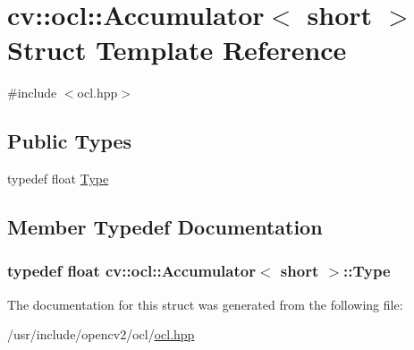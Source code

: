 \hypertarget{structcv_1_1ocl_1_1Accumulator_3_01short_01_4}{\section{cv\-:\-:ocl\-:\-:Accumulator$<$ short $>$ Struct Template Reference}
\label{structcv_1_1ocl_1_1Accumulator_3_01short_01_4}
}


{\ttfamily \#include $<$ocl.\-hpp$>$}

\subsection*{Public Types}
\begin{DoxyCompactItemize}
\item 
typedef float \hyperlink{structcv_1_1ocl_1_1Accumulator_3_01short_01_4_a200b44ab238d3f38500779d5f4cdc398}{Type}
\end{DoxyCompactItemize}


\subsection{Member Typedef Documentation}
\hypertarget{structcv_1_1ocl_1_1Accumulator_3_01short_01_4_a200b44ab238d3f38500779d5f4cdc398}{
\subsubsection[{Type}]{\setlength{\rightskip}{0pt plus 5cm}typedef float {\bf cv\-::ocl\-::\-Accumulator}$<$ short $>$\-::{\bf Type}}}\label{structcv_1_1ocl_1_1Accumulator_3_01short_01_4_a200b44ab238d3f38500779d5f4cdc398}


The documentation for this struct was generated from the following file\-:\begin{DoxyCompactItemize}
\item 
/usr/include/opencv2/ocl/\hyperlink{ocl_2ocl_8hpp}{ocl.\-hpp}\end{DoxyCompactItemize}
